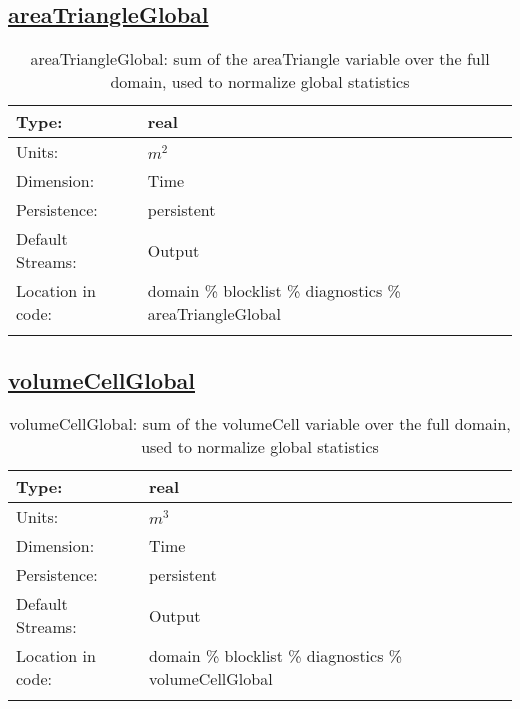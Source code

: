 \subsection[areaTriangleGlobal]{\hyperref[sec:var_tab_diagnostics]{areaTriangleGlobal}}
\label{subsec:var_sec_diagnostics_areaTriangleGlobal}
\begin{center}
\begin{longtable}{| p{2.0in} | p{4.0in} |}
        \hline 
        Type: & real \\
        \hline 
        Units: & $m^2$ \\
        \hline 
        Dimension: & Time \\
        \hline 
        Persistence: & persistent \\
        \hline 
		 Default Streams: & Output  \\
        \hline 
		 Location in code: & domain \% blocklist \% diagnostics \% areaTriangleGlobal \\
		 \hline 
    \caption{areaTriangleGlobal: sum of the areaTriangle variable over the full domain, used to normalize global statistics}
\end{longtable}
\end{center}
\subsection[volumeCellGlobal]{\hyperref[sec:var_tab_diagnostics]{volumeCellGlobal}}
\label{subsec:var_sec_diagnostics_volumeCellGlobal}
\begin{center}
\begin{longtable}{| p{2.0in} | p{4.0in} |}
        \hline 
        Type: & real \\
        \hline 
        Units: & $m^3$ \\
        \hline 
        Dimension: & Time \\
        \hline 
        Persistence: & persistent \\
        \hline 
		 Default Streams: & Output  \\
        \hline 
		 Location in code: & domain \% blocklist \% diagnostics \% volumeCellGlobal \\
		 \hline 
    \caption{volumeCellGlobal: sum of the volumeCell variable over the full domain, used to normalize global statistics}
\end{longtable}
\end{center}
